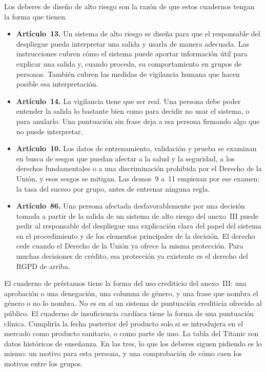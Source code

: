 \documentclass[11pt]{article}
\begin{document}
Los deberes de diseño de alto riesgo son la razón de que estos cuadernos tengan la forma que tienen.

\begin{itemize}
  \item \textbf{Artículo~13.} Un sistema de alto riesgo se diseña para que el responsable del despliegue pueda interpretar una salida y usarla de manera adecuada. Las instrucciones cubren cómo el sistema puede aportar información útil para explicar una salida y, cuando proceda, su comportamiento en grupos de personas. También cubren las medidas de vigilancia humana que hacen posible esa interpretación.
  \item \textbf{Artículo~14.} La vigilancia tiene que ser real. Una persona debe poder entender la salida lo bastante bien como para decidir no usar el sistema, o para anularlo. Una puntuación sin frase deja a esa persona firmando algo que no puede interpretar.
  \item \textbf{Artículo~10.} Los datos de entrenamiento, validación y prueba se examinan en busca de sesgos que puedan afectar a la salud y la seguridad, a los derechos fundamentales o a una discriminación prohibida por el Derecho de la Unión, y esos sesgos se mitigan. Las demos~9 a~11 empiezan por ese examen: la tasa del suceso por grupo, antes de entrenar ninguna regla.
  \item \textbf{Artículo~86.} Una persona afectada desfavorablemente por una decisión tomada a partir de la salida de un sistema de alto riesgo del anexo~III puede pedir al responsable del despliegue una explicación clara del papel del sistema en el procedimiento y de los elementos principales de la decisión. El derecho cede cuando el Derecho de la Unión ya ofrece la misma protección. Para muchas decisiones de crédito, esa protección ya existente es el derecho del RGPD de arriba.
\end{itemize}

El cuaderno de préstamos tiene la forma del uso crediticio del anexo~III: una aprobación o una denegación, una columna de género, y una frase que nombra el género o no lo nombra. No es en sí un sistema de puntuación crediticia ofrecido al público. El cuaderno de insuficiencia cardíaca tiene la forma de una puntuación clínica. Cumpliría la fecha posterior del producto solo si se introdujera en el mercado como producto sanitario, o como parte de uno. La tabla del Titanic son datos históricos de enseñanza. En las tres, lo que los deberes siguen pidiendo es lo mismo: un motivo para esta persona, y una comprobación de cómo caen los motivos entre los grupos.
\end{document}
